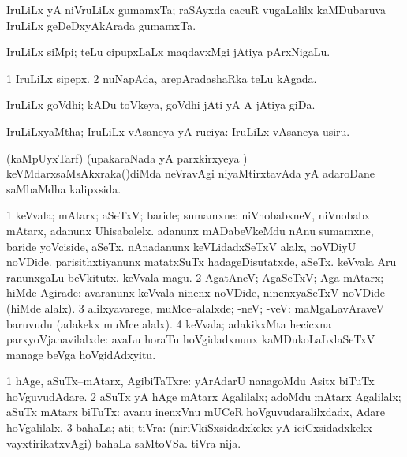 \bentry
{}
\gl{\nA}
\bmng
IruLiLx yA niVruLiLx gumamxTa; raSAyxda cacuR \mo vugaLalilx kaMDubaruva IruLiLx geDeDxyAkArada gumamxTa. 
\emng
\eentry

\bentry
{}
\gl{\nA}
\bmng
IruLiLx siMpi; teLu cipupxLaLx maqdavxMgi jAtiya pArxNigaLu. 
\emng
\eentry

\bentry
{}
\gl{\nA}
\bmng
\bnum
\num{1} IruLiLx sipepx. 
\num{2} nuNapAda, arepAradashaRka teLu kAgada. 
\enum
\emng
\eentry

\bentry
{}
\gl{\nA}
\bmng
IruLiLx goVdhi; kADu toVkeya, goVdhi jAti yA A jAtiya giDa. 
\emng
\eentry

\bentry
{}
\gl{\gu}
\bmng
IruLiLxyaMtha; IruLiLx vAsaneya yA ruciya:  IruLiLx vAsaneya usiru. 
\emng
\eentry

\bentry
{}
\gl{\gu}
\bmng
(kaMpUyxTarf) (upakaraNada yA parxkirxyeya \vi) keVMdarxsaMsAkxraka()diMda neVravAgi niyaMtirxtavAda yA adaroDane saMbaMdha kalipxsida. 
\emng
\eentry

\bentry
{}
\gl{\kirxvi}
\bmng
\bnum
\num{1} keVvala; mAtarx; aSeTxV; baride; sumamxne:  niVnobabxneV, niVnobabx mAtarx, adanunx Uhisabalelx.  adanunx mADabeVkeMdu nAnu sumamxne, baride yoVciside, aSeTx.  nAnadanunx keVLidadxSeTxV alalx, noVDiyU noVDide.  parisithxtiyanunx matatxSuTx hadageDisutatxde, aSeTx.  keVvala Aru ranunxgaLu beVkitutx.  keVvala magu. 
\num{2} AgatAneV; AgaSeTxV; Aga mAtarx; hiMde Agirade:  avaranunx keVvala ninenx noVDide, ninenxyaSeTxV noVDide (hiMde alalx). 
\num{3} alilxyavarege, muMce--alalxde; -neV; -veV:  maMgaLavAraveV baruvudu (adakekx muMce alalx). 
\num{4} keVvala; adakikxMta hecicxna parxyoVjanavilalxde:  avaLu horaTu hoVgidadxnunx kaMDukoLaLxlaSeTxV manage beVga hoVgidAdxyitu. 
\enum
\emng

\noindent
\gl{\pagu}
\bmng
\bnum
\num{1}  hAge, aSuTx--mAtarx, AgibiTaTxre:  yArAdarU nanagoMdu Asitx biTuTx hoVguvudAdare. 
\num{2}  aSuTx yA hAge mAtarx Agalilalx; adoMdu mAtarx Agalilalx; aSuTx mAtarx biTuTx:  avanu inenxVnu mUCeR hoVguvudaralilxdadx, Adare hoVgalilalx. 
\num{3}  bahaLa; ati; tiVra:  (niriVkiSxsidadxkekx yA iciCxsidadxkekx vayxtirikatxvAgi) bahaLa saMtoVSa.  tiVra nija. 
\enum
\emng
\eentry

